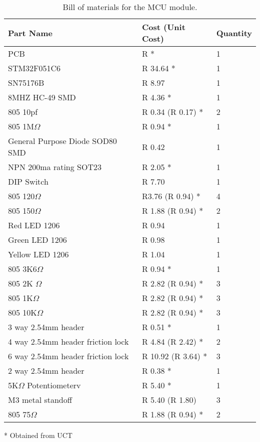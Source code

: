 \documentclass[a4paper,11pt]{article}
\numberwithin{figure}{section}
\numberwithin{table}{section}
\begin{document}
	\begin{table}[ht]
	\centering		
	\begin{tabular}{| m{8cm} | m{4cm}| m{3cm} |}
	\hline
	\textbf{Part Name} & \textbf{Cost  (Unit Cost)} & \textbf{Quantity} \\
	\hline
	PCB & R * & 1 \\
	\hline
	STM32F051C6 & R 34.64 * & 1 \\
	\hline
	SN75176B & R 8.97 & 1 \\
	\hline
	8MHZ HC-49 SMD & R 4.36 * & 1 \\
	\hline
	805 10pf & R 0.34 (R 0.17) *  & 2 \\
	\hline
	805 1M$\Omega$ & R 0.94 * & 1 \\
	\hline
	General Purpose Diode SOD80 SMD & R 0.42 & 1 \\ 
	\hline
	NPN 200ma rating SOT23 & R 2.05 * & 1\\
	\hline
	DIP Switch & R 7.70 & 1 \\
	\hline
	805 120$\Omega$ & R3.76 (R 0.94) * & 4 \\
	\hline
	805 150$\Omega$ & R 1.88 (R 0.94) * & 2 \\
	\hline
	Red LED 1206 & R 0.94 & 1 \\
	\hline
	Green LED 1206 & R 0.98 & 1 \\
	\hline
	Yellow LED 1206 & R 1.04 & 1 \\
	\hline
	805 3K6$\Omega$ & R 0.94 * & 1 \\
	\hline
	805 2K $\Omega$ & R 2.82 (R 0.94) * & 3 \\
	\hline
	805 1K$\Omega$ & R 2.82 (R 0.94) * & 3 \\
	\hline
	805 10K$\Omega$ & R 2.82 (R 0.94) * & 3 \\
	\hline
	3 way 2.54mm header & R 0.51 * & 1 \\
	\hline
	4 way 2.54mm header friction lock & R 4.84 (R 2.42) * & 2 \\
	\hline
	6 way 2.54mm header friction lock & R 10.92 (R 3.64) * & 3 \\
	\hline
	2 way 2.54mm header & R 0.38 * & 1 \\
	\hline
	5K$\Omega$ Potentiometerv & R 5.40 * & 1 \\
	\hline
	M3 metal standoff & R 5.40 (R 1.80) & 3 \\
	\hline
	805 75$\Omega$ & R 1.88 (R 0.94) * & 2 \\ 
	\hline
	  
	\end{tabular}
	
	 * Obtained from UCT
	\caption{Bill of materials for the MCU module. \label{tab:bommcu}}
	\end{table}	
	\FloatBarrier
\newpage
\end{document}
